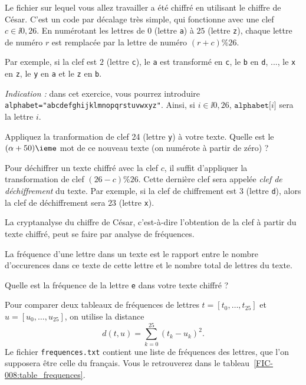Le fichier sur lequel vous allez travailler a été chiffré en utilisant le chiffre de César. C'est un code par décalage très simple, qui fonctionne avec une clef $c \in \ii{0,26}$. 
En numérotant les lettres de $0$ (lettre \texttt a) à $25$ (lettre \texttt z), chaque lettre de numéro $r$ est remplacée par la lettre de numéro $(r+c) \% 26$. 

Par exemple, si la clef est $2$ (lettre \texttt c), le \texttt a est transformé en \texttt c, le \texttt b en \texttt d, ..., le \texttt x en \texttt z, le \texttt y en \texttt a et le \texttt z en \texttt b.

\medskip{}

\emph{Indication :} dans cet exercice, vous pourrez introduire \texttt{alphabet="abcdefghijklmnopqrstuvwxyz"}. Ainsi, si $i\in \ii{0,26}$, $\texttt{alphabet[}i\texttt{]}$ sera la lettre \no$i$.

\medskip{}

\question{} Appliquez la tranformation de clef 24 (lettre \texttt y) à votre texte. Quelle est le $(\alpha+50)\ieme$ mot de ce nouveau texte (on numérote à partir de zéro) ?

\medskip{}

Pour déchiffrer un texte chiffré avec la clef $c$, il suffit d'appliquer la transformation de clef $(26 - c) \% 26$. Cette dernière clef sera appelée \emph{clef de déchiffrement} du texte.
Par exemple, si la clef de chiffrement est $3$ (lettre \texttt d), alors la clef de déchiffrement sera $23$ (lettre \texttt x).

La cryptanalyse du chiffre de César, c'est-à-dire l'obtention de la clef à partir du texte chiffré, peut se faire par analyse de fréquences. 

La fréquence d'une lettre dans un texte est le rapport entre le nombre d'occurences dans ce texte de cette lettre et le nombre total de lettres du texte. 

\medskip{}

\question{} Quelle est la fréquence de la lettre \texttt{e} dans votre texte chiffré ? 

\medskip{}

Pour comparer deux tableaux de fréquences de lettres $t = [t_0,\dots,t_ {25}]$ et $u = [u_0,\dots,u_{25}]$, on utilise la distance 
\begin{equation*}
    d(t,u) = \sum_{k=0}^{25} (t_k-u_k)^2.
\end{equation*}
Le fichier \texttt{frequences.txt} contient une liste de fréquences des lettres, que l'on supposera être celle du français. Vous le retrouverez dans le tableau~\ref{FIC-008:table_frequences}. 

